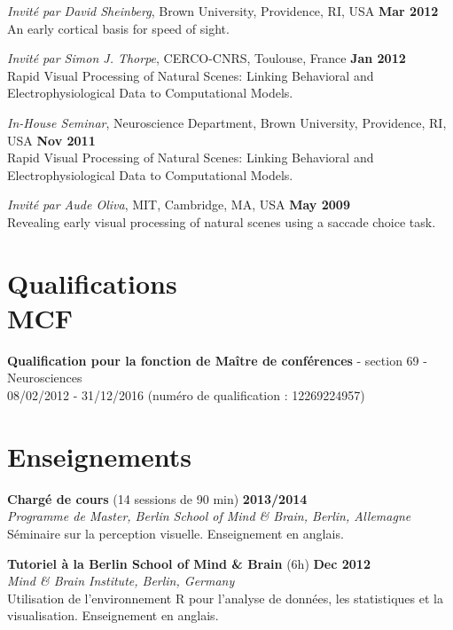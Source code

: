 \documentclass[margin,line]{resume}
\begin{document}
\begin{resume}
	\vspace{-2mm} 
	\textit{Invité par David Sheinberg}, Brown University, Providence, RI, USA \hfill \textbf{Mar 2012}\\
	An early cortical basis for speed of sight. 

	\vspace{-2mm} 
	\textit{Invité par Simon J. Thorpe}, CERCO-CNRS, Toulouse, France \hfill \textbf{Jan 2012}\\
	Rapid Visual Processing of Natural Scenes: Linking Behavioral and Electrophysiological Data to Computational Models.

	\vspace{-2mm} 
	\textit{In-House Seminar}, Neuroscience Department, Brown University, Providence, RI, USA \hfill \textbf{Nov 2011}\\
	Rapid Visual Processing of Natural Scenes: Linking Behavioral and Electrophysiological Data to Computational Models.

	\vspace{-2mm} 
	\textit{Invité par Aude Oliva}, MIT, Cambridge, MA, USA \hfill \textbf{May 2009}\\
	Revealing early visual processing of natural scenes using a saccade choice task.

	\normalsize

\vspace{3mm}
\section{\mysidestyle Qualifications\\MCF}
    \textbf{Qualification pour la fonction de Maître de conférences} - section 69 - Neurosciences\\
    08/02/2012 - 31/12/2016 (numéro de qualification : 12269224957)
    
    
\vspace{3mm}
\section{\mysidestyle Enseignements}
	
	\textbf{Chargé de cours} (14 sessions de 90 min) \hfill \textbf{2013/2014}\\
	\textsl{Programme de Master, Berlin School of Mind \& Brain, Berlin, Allemagne}\\
	Séminaire sur la perception visuelle. Enseignement en anglais.
	
	\vspace{-2mm}
	\textbf{Tutoriel à la Berlin School of Mind \& Brain} (6h) \hfill \textbf{Dec 2012}\\
	\textsl{Mind \& Brain Institute, Berlin, Germany}\\
	Utilisation de l'environnement R pour l'analyse de données, les statistiques et la visualisation.  Enseignement en anglais.


\end{resume}
\end{document}

